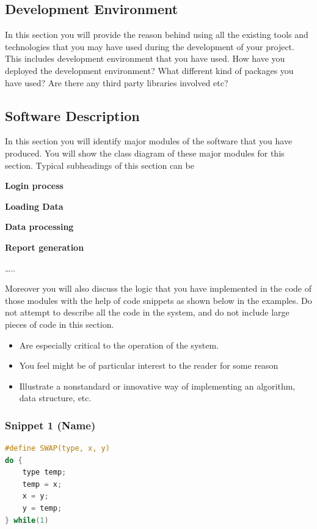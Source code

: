 \subsection{Development Environment}
In this section you will provide the reason behind using all the existing tools and technologies that you may have used during the development of your project. This includes development environment that you have used. How have you deployed the development environment? What different kind of packages you have used? Are there any third party libraries involved etc?

\subsection{Software Description}
In this section you will identify major modules of the software that you have produced. You will show the class diagram of these major modules for this section. Typical subheadings of this section can be

\textbf{Login process}

\textbf{Loading Data}

\textbf{Data processing}

\textbf{Report generation}

…..

Moreover you will also discuss the logic that you have implemented in the code of those modules with the help of code snippets as shown below in the examples. Do not attempt to describe all the code in the system, and do not include large pieces of code in this section.

\begin{itemize}
    \item Are especially critical to the operation of the system.
    \item You feel might be of particular interest to the reader for some reason
    \item Illustrate a nonstandard or innovative way of implementing an algorithm, data structure, etc.
\end{itemize}


\subsubsection{Snippet 1 (Name)}

\begin{lstlisting}[language=C]
#define SWAP(type, x, y) 
do { 
    type temp; 
    temp = x; 
    x = y; 
    y = temp; 
} while(1)
\end{lstlisting}


